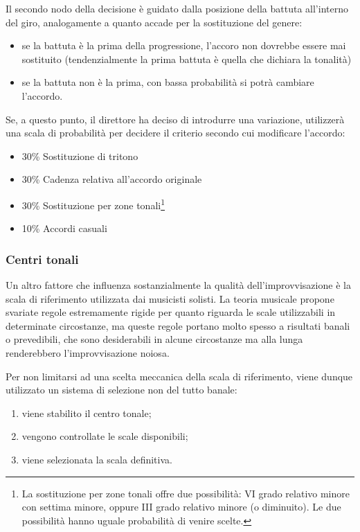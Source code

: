 Il secondo nodo della decisione è guidato dalla posizione della battuta all'interno del giro, analogamente a quanto accade per la sostituzione del genere:
\begin{itemize}
\item se la battuta è la prima della progressione, l'accoro non dovrebbe essere mai sostituito (tendenzialmente la prima battuta è quella che dichiara la tonalità)
\item se la battuta non è la prima, con bassa probabilità si potrà cambiare l'accordo.
\end{itemize}

Se, a questo punto, il direttore ha deciso di introdurre una variazione, utilizzerà una scala di probabilità per decidere il criterio secondo cui modificare l'accordo:

\begin{itemize}
\item 30\% Sostituzione di tritono
\item 30\% Cadenza relativa all'accordo originale
\item 30\% Sostituzione per zone tonali\footnote{La sostituzione per zone tonali offre due possibilità: VI grado relativo minore con settima minore, oppure III grado relativo minore (o diminuito). Le due possibilità hanno uguale probabilità di venire scelte.}
\item 10\% Accordi casuali
\end{itemize}

\subsubsection{Centri tonali}\label{dir-tonalZones}
Un altro fattore che influenza sostanzialmente la qualità dell'improvvisazione è la scala di riferimento utilizzata dai musicisti solisti. 
La teoria musicale propone svariate regole estremamente rigide per quanto riguarda le scale utilizzabili in determinate circostanze, ma queste regole portano molto spesso a risultati banali o prevedibili, che sono desiderabili in alcune circostanze ma alla lunga renderebbero l'improvvisazione noiosa.

Per non limitarsi ad una scelta meccanica della scala di riferimento, viene dunque utilizzato un sistema di selezione non del tutto banale:

\begin{enumerate}
\item viene stabilito il centro tonale;
\item vengono controllate le scale disponibili;
\item viene selezionata la scala definitiva.
\end{enumerate}


